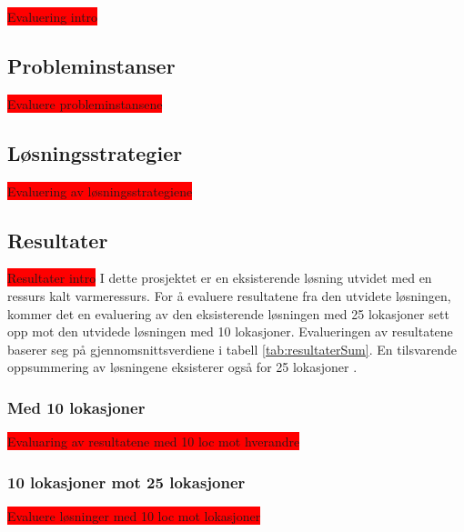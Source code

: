 \colorbox{red}{Evaluering intro}

\subsection{Probleminstanser}
\colorbox{red}{Evaluere probleminstansene}

\subsection{Løsningsstrategier}
\colorbox{red}{Evaluering av løsningsstrategiene}

\subsection{Resultater}
\colorbox{red}{Resultater intro}
I dette prosjektet er en eksisterende løsning utvidet med en ressurs kalt varmeressurs. For å evaluere resultatene fra den utvidete løsningen, kommer det en evaluering av den eksisterende løsningen med 25 lokasjoner sett opp mot den utvidede løsningen med 10 lokasjoner. Evalueringen av resultatene baserer seg på gjennomsnittsverdiene i tabell \ref{tab:resultaterSum}. En tilsvarende oppsummering av løsningene eksisterer også for 25 lokasjoner \cite{tvedtbezem}.

\subsubsection{Med 10 lokasjoner}
\colorbox{red}{Evaluaring av resultatene med 10 loc mot hverandre}

\subsubsection{10 lokasjoner mot 25 lokasjoner}
\colorbox{red}{Evaluere løsninger med 10 loc mot  lokasjoner}